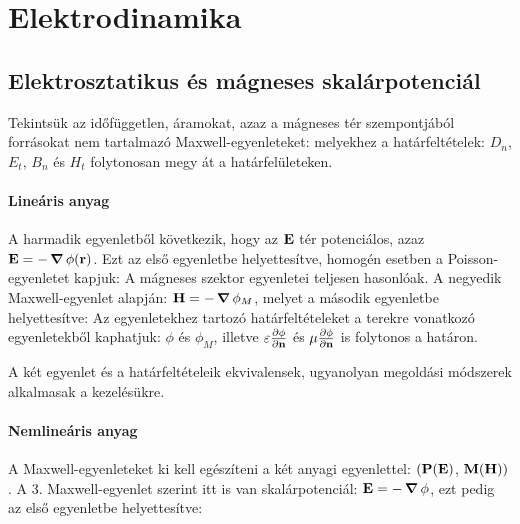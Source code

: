    
 \section{Elektrodinamika}
  
  \subsection{Elektrosztatikus és mágneses skalárpotenciál}
   
   Tekintsük az időfüggetlen, áramokat, azaz a mágneses tér szempontjából forrásokat nem tartalmazó Maxwell-egyenleteket:
   melyekhez a határfeltételek: $D_n$, $E_t$, $B_n$ és $H_t$ folytonosan megy át a határfelületeken.
   
   \paragraph{Lineáris anyag}
   
    A harmadik egyenletből következik, hogy az $\mathbf{E}$ tér potenciálos, azaz $\mathbf{E}=-\mathop{\boldsymbol{\nabla}}\nolimits{\phi(\mathbf{r})}$. Ezt az első egyenletbe helyettesítve, homogén esetben a Poisson-egyenletet kapjuk:
    A mágneses szektor egyenletei teljesen hasonlóak. A negyedik Maxwell-egyenlet alapján: $\mathbf{H}=-\mathop{\boldsymbol{\nabla}}\nolimits{\phi_M}$, melyet a második egyenletbe helyettesítve:
    Az egyenletekhez tartozó határfeltételeket a terekre vonatkozó egyenletekből kaphatjuk: $\phi$ és $\phi_M$, illetve $\varepsilon\frac{\partial \phi}{\partial \mathbf{n}}$ és $\mu\frac{\partial \phi}{\partial \mathbf{n}}$ is folytonos a határon.
    
    A két egyenlet és a határfeltételeik ekvivalensek, ugyanolyan megoldási módszerek alkalmasak a kezelésükre.
    
   \paragraph{Nemlineáris anyag}
    
    A Maxwell-egyenleteket ki kell egészíteni a két anyagi egyenlettel: $(\mathbf{P}(\mathbf{E})$, $\mathbf{M}(\mathbf{H}))$. A 3. Maxwell-egyenlet szerint itt is van skalárpotenciál: $\mathbf{E}=-\mathop{\boldsymbol{\nabla}}\nolimits{\phi}$, ezt pedig az első egyenletbe helyettesítve:
    
